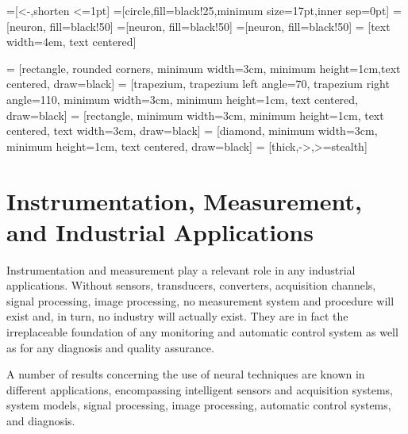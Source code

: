\documentclass[12pt, right open]{memoir}
\begin{document}

=[<-,shorten <=1pt]
=[circle,fill=black!25,minimum size=17pt,inner sep=0pt]
=[neuron, fill=black!50]
=[neuron, fill=black!50]
=[neuron, fill=black!50]
 = [text width=4em, text centered]

 = [rectangle, rounded corners, minimum width=3cm, minimum height=1cm,text centered, draw=black]
 = [trapezium, trapezium left angle=70, trapezium right angle=110, minimum width=3cm, minimum height=1cm, text centered, draw=black]
 = [rectangle, minimum width=3cm, minimum height=1cm, text centered, text width=3cm, draw=black]
 = [diamond, minimum width=3cm, minimum height=1cm, text centered, draw=black]
 = [thick,->,>=stealth]

\chapter{Instrumentation, Measurement,
and Industrial Applications}

Instrumentation and measurement play a relevant role in any industrial applications.
Without sensors, transducers, converters, acquisition channels, signal processing, image
processing, no measurement system and procedure will exist and, in turn, no industry will
actually exist. They are in fact the irreplaceable foundation of any monitoring and
automatic control system as well as for any diagnosis and quality assurance.

A number of results concerning the use of neural techniques are known in
different applications, encompassing intelligent sensors and acquisition systems, system
models, signal processing, image processing, automatic control systems, and diagnosis.
\end{document}
